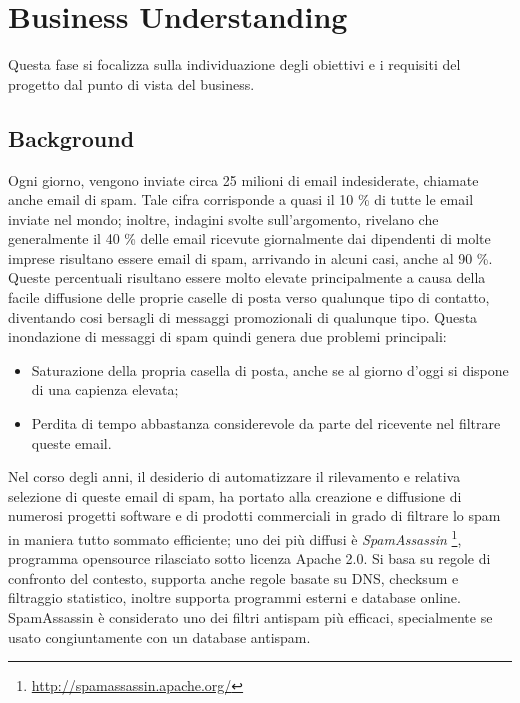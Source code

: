 \chapter{Business Understanding}
Questa fase si focalizza sulla individuazione degli obiettivi e i requisiti del progetto dal punto di vista del business.

\section{Background}\label{Background}
Ogni giorno, vengono inviate circa 25 milioni di email indesiderate, chiamate anche email di spam. Tale cifra corrisponde a quasi il 10 \% di tutte le email inviate nel mondo; inoltre, indagini svolte sull'argomento, rivelano che generalmente il 40 \% delle email ricevute giornalmente dai dipendenti di molte imprese risultano essere email di spam, arrivando in alcuni casi, anche al 90 \%.
Queste percentuali risultano essere molto elevate principalmente a causa della facile diffusione delle proprie caselle di posta verso qualunque tipo di contatto, diventando cosi bersagli di messaggi promozionali di qualunque tipo. Questa inondazione di messaggi di spam quindi genera due problemi principali:
\begin{itemize}
\item Saturazione della propria casella di posta, anche se al giorno d'oggi si dispone di una capienza elevata;
\item Perdita di tempo abbastanza considerevole da parte del ricevente nel filtrare queste email.
\end{itemize}

Nel corso degli anni, il desiderio di automatizzare il rilevamento e relativa selezione di queste email di spam, ha portato alla creazione e diffusione di numerosi progetti software e di prodotti commerciali in grado di filtrare lo spam in maniera tutto sommato efficiente; uno dei più diffusi è \textit{SpamAssassin} \footnote{\url{http://spamassassin.apache.org/}}, programma opensource rilasciato sotto licenza Apache 2.0. Si basa su regole di confronto del contesto, supporta anche regole basate su DNS, checksum e filtraggio statistico, inoltre supporta programmi esterni e database online.
SpamAssassin è considerato uno dei filtri antispam più efficaci, specialmente se usato congiuntamente con un database antispam.\cite{wiki:SpamAssassin}

